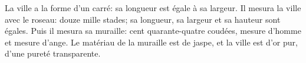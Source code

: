 La ville a la forme d’un carré:
	sa longueur est égale à sa largeur.
Il mesura la ville avec le roseau:
	douze mille stades; sa longueur, sa largeur et sa hauteur sont égales.
Puis il mesura sa muraille:
	cent quarante-quatre coudées, mesure d’homme et mesure d’ange.
Le matériau de la muraille est de jaspe,
	et la ville est d’or pur, d’une pureté transparente.
